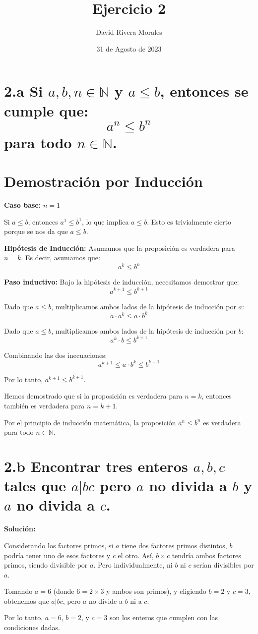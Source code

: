 \documentclass[12pt,a4paper]{article}
\begin{document}
\title{Ejercicio 2}
\author{David Rivera Morales}
\date{31 de Agosto de 2023}
\maketitle

\section*{2.a Si \(a, b, n \in \mathbb{N}\) y \(a \leq b\), entonces se cumple que:
\[a^n \leq b^n\] para todo \(n \in \mathbb{N}\).}


\section*{Demostración por Inducción}

\textbf{Caso base:} \(n = 1\)

Si \(a \leq b\), entonces \(a^1 \leq b^1\), lo que implica \(a \leq b\). Esto es trivialmente cierto porque se nos da que \(a \leq b\).

\textbf{Hipótesis de Inducción:} Asumamos que la proposición es verdadera para \(n = k\). Es decir, asumamos que:
\[a^k \leq b^k\]

\textbf{Paso inductivo:} Bajo la hipótesis de inducción, necesitamos demostrar que:
\[a^{k+1} \leq b^{k+1}\]

Dado que \(a \leq b\), multiplicamos ambos lados de la hipótesis de inducción por \(a\):
\[a \cdot a^k \leq a \cdot b^k\]

Dado que \(a \leq b\), multiplicamos ambos lados de la hipótesis de inducción por \(b\):
\[a^k \cdot b \leq b^{k+1}\]

Combinando las dos inecuaciones:
\[a^{k+1} \leq a \cdot b^k \leq b^{k+1}\]

Por lo tanto, \(a^{k+1} \leq b^{k+1}\).

Hemos demostrado que si la proposición es verdadera para \(n = k\), entonces también es verdadera para \(n = k + 1\).

Por el principio de inducción matemática, la proposición \(a^n \leq b^n\) es verdadera para todo \(n \in \mathbb{N}\).

\section*{2.b Encontrar tres enteros \(a, b, c\) tales que \(a | bc\) pero \(a\) no divida a \(b\) y \(a\) no divida a \(c\).}

\textbf{Solución:}

Considerando los factores primos, si \(a\) tiene dos factores primos distintos, \(b\) podría tener uno de esos factores y \(c\) el otro. Así, \(b \times c\) tendría ambos factores primos, siendo divisible por \(a\). Pero individualmente, ni \(b\) ni \(c\) serían divisibles por \(a\).

Tomando \(a = 6\) (donde \(6 = 2 \times 3\) y ambos son primos), y eligiendo \(b = 2\) y \(c = 3\), obtenemos que \(a | bc\), pero \(a\) no divide a \(b\) ni a \(c\).

Por lo tanto, \(a = 6\), \(b = 2\), y \(c = 3\) son los enteros que cumplen con las condiciones dadas.
\end{document}
